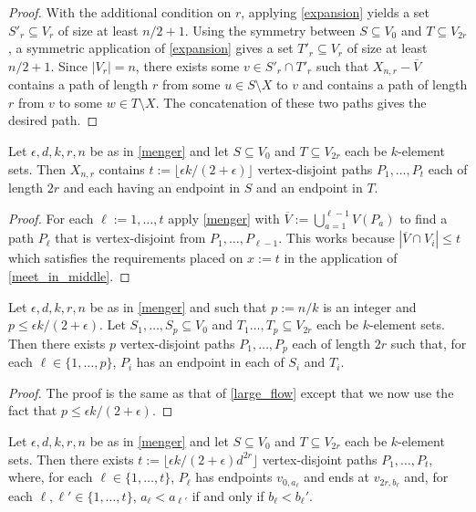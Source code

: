 \documentclass{patmorin}
\begin{document}
\begin{proof}
  With the additional condition on $r$,
  applying \cref{expansion} yields a set $S'_r\subseteq V_{r}$ of size at least $n/2+1$.  Using the symmetry between $S\subseteq V_0$ and $T\subseteq V_{2r}$, a symmetric application of \cref{expansion} gives a set $T'_r\subseteq V_{r}$ of size at least $n/2+1$.  Since $|V_r|=n$,  there exists some $v\in S'_r\cap T'_r$ such that $X_{n,r}-\overline{V}$ contains a path of length $r$ from some $u\in S\setminus X$ to $v$ and contains a path of length $r$ from $v$ to some $w\in T\setminus X$.  The concatenation of these two paths gives the desired path.
\end{proof}

\begin{lem}\label{large_flow}
  Let $\epsilon, d, k, r, n$ be as in \cref{menger} and let $S\subseteq V_0$ and $T\subseteq V_{2r}$ each be $k$-element sets.  Then $X_{n,r}$ contains $t:= \lfloor \epsilon k / (2+\epsilon)\rfloor$ vertex-disjoint paths $P_1,\ldots,P_{t}$ each of length $2r$ and each having an endpoint in $S$ and an endpoint in $T$.
\end{lem}

\begin{proof}
  For each $\ell:=1,\ldots,t$ apply \cref{menger} with $\overline{V}:=\bigcup_{a=1}^{\ell-1} V(P_a)$ to find a path $P_\ell$ that is vertex-disjoint from $P_{1},\ldots,P_{\ell-1}$.  This works because $|\overline{V}\cap V_i|\le t$ which satisfies the requirements placed on $x:=t$ in the application of \cref{meet_in_middle}.
\end{proof}

\begin{lem}\label{large_crossing_flow}
  Let $\epsilon, d, k, r, n$ be as in \cref{menger} and such that $p:=n/k$ is an integer and $p\le \epsilon k/(2+\epsilon)$. Let $S_1,\ldots,S_p\subseteq V_0$ and $T_1\ldots,T_p\subseteq V_{2r}$ each be $k$-element sets.  Then there exists $p$ vertex-disjoint paths $P_1,\ldots,P_{p}$ each of length $2r$ such that, for each $\ell\in\{1,\ldots,p\}$, $P_i$ has an endpoint in each of $S_i$ and $T_i$.
\end{lem}

\begin{proof}
  The proof is the same as that of \cref{large_flow} except that we now use the fact that $p\le \epsilon k/(2+\epsilon)$.
\end{proof}


\begin{lem}\label{large_ordered_flow}
  Let $\epsilon, d, k, r, n$ be as in \cref{menger} and let $S\subseteq V_0$ and $T\subseteq V_{2r}$ each be $k$-element sets.  Then there exists $t:= \lfloor \epsilon k / (2+\epsilon)d^{2r}\rfloor$ vertex-disjoint paths $P_1,\ldots,P_{t}$, where, for each $\ell\in\{1,\ldots,t\}$, $P_\ell$ has endpoints $v_{0,a_\ell}$ and ends at $v_{2r,b_\ell}$ and, for each $\ell,\ell'\in\{1,\ldots,t\}$, $a_\ell < a_{\ell'}$ if and only if $b_\ell < b_\ell'$.
\end{lem}
\end{document}
